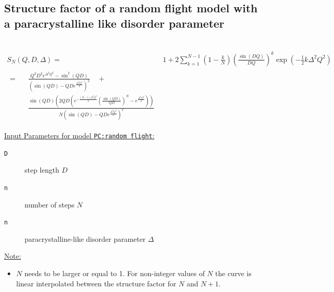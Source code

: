 \subsection{ Structure factor of a random flight model with a paracrystalline like disorder parameter}~\\ \label{sec:pcRandomFlight}
\begin{align}\label{eq:pcRFsum}
  S_N(Q,D,\Delta) =&  1+2 \sum _{k=1}^{N-1} \left(1-\frac{k}{N}\right) \left(\frac{\sin (D Q)}{D
   Q}\right)^k \exp \left(-\frac{1}{2} k \Delta^2 Q^2\right) \\
   \begin{split} =& \quad
   \frac{Q^2 D^2 e^{\Delta^2 Q^2}-\sin^2 (Q D) }{
   \left(\sin (QD)-QD e^{\frac{\Delta^2 Q^2}{2}}\right)^2} \quad +\\
        &  \quad
   \frac{\sin (Q D) \left(2 Q D
   \left(e^{-\frac{(N-1)\Delta^2  Q^2}{2}} \left(\frac{\sin (QD)}{Q
   D}\right)^N-e^{\frac{\Delta^2 Q^2}{2}}\right)\right)}{N
   \left(\sin (QD)-QD e^{\frac{\Delta^2 Q^2}{2}}\right)^2}
   \end{split} \label{eq:pcRFanalytical}
\end{align}

\noindent \uline{Input Parameters for model \texttt{PC:random flight}:}\\
\begin{description}
\item[\texttt{D}] step length $D$
\item[\texttt{n}] number of steps $N$
\item[\texttt{n}] paracrystalline-like disorder parameter $\Delta$
\end{description}

\noindent\uline{Note:}
\begin{itemize}
\item $N$ needs to be larger or equal to 1. For non-integer values of $N$ the curve is linear interpolated between the structure factor for $N$ and $N+1$.
\end{itemize}

